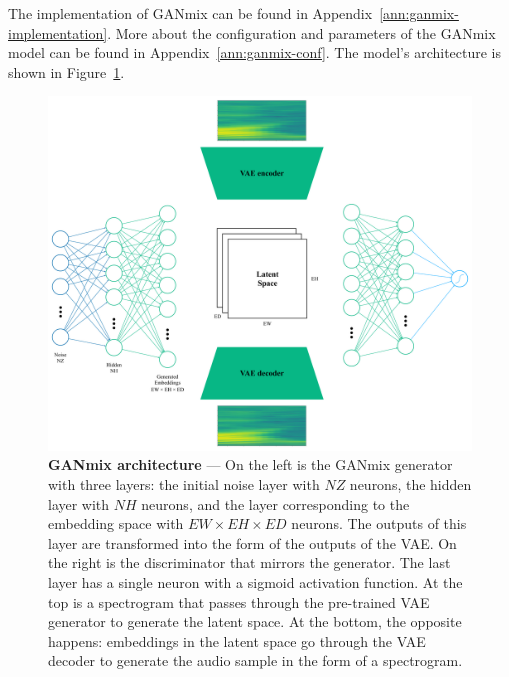The implementation of GANmix can be found in Appendix~\ref{ann:ganmix-implementation}. More about the configuration and parameters of the GANmix model can be found in Appendix~\ref{ann:ganmix-conf}. The model's architecture is shown in Figure~\ref{fig:ganmix-architecture}.

\begin{figure}[ht]
    \centering
    \includegraphics[width=\textwidth]{figures/4-solution/ganmix.pdf}
    \caption[GANmix architecture]{\textbf{GANmix architecture} --- On the left is the GANmix generator with three layers: the initial noise layer with $NZ$ neurons, the hidden layer with $NH$ neurons, and the layer corresponding to the embedding space with $EW \times EH \times ED$ neurons. The outputs of this layer are transformed into the form of the outputs of the \ac{VAE}. On the right is the discriminator that mirrors the generator. The last layer has a single neuron with a sigmoid activation function. At the top is a spectrogram that passes through the pre-trained \ac{VAE} generator to generate the latent space. At the bottom, the opposite happens: embeddings in the latent space go through the \ac{VAE} decoder to generate the audio sample in the form of a spectrogram.}
    \label{fig:ganmix-architecture}
\end{figure}
